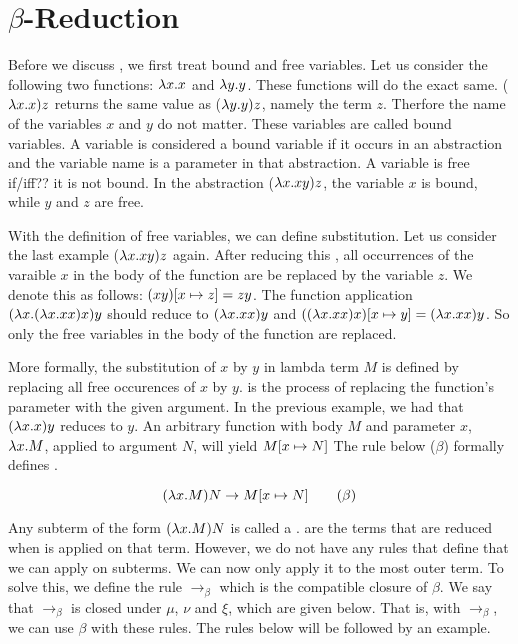 \section{\texorpdfstring{\boldmath${\beta}$-Reduction}{Beta Reduction}}
Before we discuss \br, we first treat bound and free variables. Let us consider the following two functions: $\lambda x. x$ and $\lambda y. y$. These functions will do the exact same.
($\lambda x. x) z$ returns the same value as ($\lambda y.y) z$, namely the term $z$. Therfore the name of the variables $x$ and $y$ do not matter. These variables are called bound variables.
A variable is considered a bound variable if it occurs in an abstraction and the variable name is a parameter in that abstraction. A variable is free if/iff?? it is not bound.
In the abstraction ($\lambda x. xy) z$, the variable $x$ is bound, while $y$ and $z$ are free.

With the definition of free variables, we can define substitution. Let us consider the last example ($\lambda x. xy) z$ again. After reducing this \lterm, all occurrences of the varaible $x$ in the body of the function are be replaced by the variable $z$.
We denote this as follows: $(xy) [{x}\mapsto{z}] = zy$. The function application $(\lambda x. (\lambda x. x x) x)y$ should reduce to $(\lambda x. x x) y$ and $((\lambda x. x x) x) [{x}\mapsto{y}] = (\lambda x. x x) y$. So only the free variables in the body of the function are replaced.

More formally, the substitution of $x$ by $y$ in lambda term $M$ is defined by replacing all free occurences of $x$ by $y$.
\br is the process of replacing the function's parameter with the given argument. In the previous example, we had that $(\lambda x. x)y$ reduces to $y$.
An arbitrary function with body $M$ and parameter $x$, $\lambda x. M$, applied to argument $N$, will yield $M [{x}\mapsto{N}]$
The rule below ($\beta$) formally defines \br.

\vspace{10pt}
\[
	(\lambda x. M)N \rightarrow M [{x}\mapsto{N}] \quad \quad (\beta)
\]

\vspace{10pt}
Any subterm of the form $(\lambda x. M) N$ is called a \bre. \bres are the terms that are reduced when \br is applied on that term.
However, we do not have any rules that define that we can apply \br on subterms. We can now only apply it to the most outer term.
To solve this, we define the rule $\rightarrow_\beta$ which is the compatible closure of $\beta$.
We say that $\rightarrow_\beta$ is closed under $\mu$, $\nu$ and $\xi$, which are given below. That is, with $\rightarrow_\beta$, we can use $\beta$ with these rules.
The rules below will be followed by an example.

